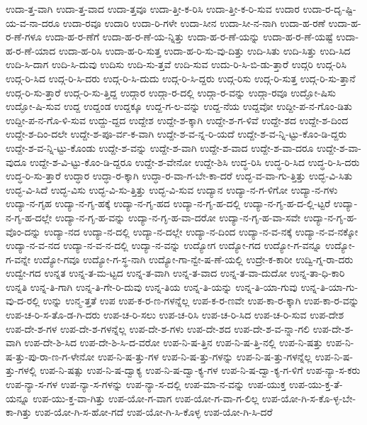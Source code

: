 {ಉದಾ-ತ್ತ-ವಾಗಿ
ಉದಾ-ತ್ತ-ವಾದ
ಉದಾ-ತ್ತವೂ
ಉದಾ-ತ್ತೀ-ಕ-ರಿಸಿ
ಉದಾ-ತ್ತೀ-ಕ-ರಿ-ಸುವ
ಉದಾರ
ಉದಾ-ರ-ದೃ-ಷ್ಟಿ-ಯ-ವ-ನಾ-ದರೂ
ಉದಾ-ರವೂ
ಉದಾರಿ
ಉದಾ-ರಿ-ಗಳೇ
ಉದಾ-ಸೀನ
ಉದಾ-ಸೀ-ನ-ನಾಗಿ
ಉದಾ-ಹ-ರಣೆ
ಉದಾ-ಹ-ರ-ಣೆ-ಗಳೂ
ಉದಾ-ಹ-ರ-ಣೆಗೆ
ಉದಾ-ಹ-ರ-ಣೆ-ಯ-ನ್ನಿತ್ತು
ಉದಾ-ಹ-ರ-ಣೆ-ಯನ್ನು
ಉದಾ-ಹ-ರ-ಣೆ-ಯಷ್ಟೆ
ಉದಾ-ಹ-ರ-ಣೆ-ಯಾದ
ಉದಾ-ಹ-ರಿಸಿ
ಉದಾ-ಹ-ರಿ-ಸುತ್ತ
ಉದಾ-ಹ-ರಿ-ಸು-ವು-ದಿತ್ತು
ಉದಿ-ಸಿತು
ಉದಿ-ಸಿತ್ತು
ಉದಿ-ಸಿದ
ಉದಿ-ಸಿ-ದಾಗ
ಉದಿ-ಸಿ-ದುವು
ಉದಿಸು
ಉದಿ-ಸು-ತ್ತವೆ
ಉದಿ-ಸುವ
ಉದು-ರಿ-ಸಿ-ಬಿ-ಡು-ತ್ತಾರೆ
ಉದ್ಗರಿ
ಉದ್ಗ-ರಿಸಿ
ಉದ್ಗ-ರಿ-ಸಿದ
ಉದ್ಗ-ರಿ-ಸಿ-ದರು
ಉದ್ಗ-ರಿ-ಸಿ-ದುದು
ಉದ್ಗ-ರಿ-ಸಿ-ದ್ದರು
ಉದ್ಗ-ರಿಸು
ಉದ್ಗ-ರಿ-ಸುತ್ತ
ಉದ್ಗ-ರಿ-ಸು-ತ್ತಾನೆ
ಉದ್ಗ-ರಿ-ಸು-ತ್ತಾರೆ
ಉದ್ಗ-ರಿ-ಸು-ತ್ತಿದ್ದ
ಉದ್ಗಾರ
ಉದ್ಗಾ-ರ-ದಲ್ಲಿ
ಉದ್ಗಾ-ರ-ವನ್ನು
ಉದ್ಗಾ-ರವೂ
ಉದ್ಘೋ-ಷಿಸು
ಉದ್ಘೋ-ಷಿ-ಸುವ
ಉದ್ದ
ಉದ್ದಂಡ
ಉದ್ದಕ್ಕೂ
ಉದ್ದ-ಗ-ಲ-ವನ್ನು
ಉದ್ದ-ನೆಯ
ಉದ್ದವೋ
ಉದ್ದೀ-ಪ-ನ-ಗೊಂ-ಡಿತು
ಉದ್ದೀ-ಪ-ನ-ಗೊ-ಳಿ-ಸುವ
ಉದ್ದು-ದ್ದದ
ಉದ್ದೇಶ
ಉದ್ದೇ-ಶ-ಕ್ಕಾಗಿ
ಉದ್ದೇ-ಶ-ಗ-ಳಿವೆ
ಉದ್ದೇ-ಶದ
ಉದ್ದೇ-ಶ-ದಿಂದ
ಉದ್ದೇ-ಶ-ದಿಂ-ದಲೇ
ಉದ್ದೇ-ಶ-ಪೂ-ರ್ವ-ಕ-ವಾಗಿ
ಉದ್ದೇ-ಶ-ವ-ನ್ನ-ರಿ-ಯದೆ
ಉದ್ದೇ-ಶ-ವ-ನ್ನಿ-ಟ್ಟು-ಕೊಂ-ಡಿ-ದ್ದರು
ಉದ್ದೇ-ಶ-ವ-ನ್ನಿ-ಟ್ಟು-ಕೊಂಡು
ಉದ್ದೇ-ಶ-ವನ್ನು
ಉದ್ದೇ-ಶ-ವಾಗಿ
ಉದ್ದೇ-ಶ-ವಾದ
ಉದ್ದೇ-ಶ-ವಾ-ದರೂ
ಉದ್ದೇ-ಶ-ವಾ-ವುದೂ
ಉದ್ದೇ-ಶ-ವಿ-ಟ್ಟು-ಕೊಂ-ಡಿ-ದ್ದರೂ
ಉದ್ದೇ-ಶ-ವೇನೋ
ಉದ್ದೇ-ಶಿಸಿ
ಉದ್ಧ-ರಿಸಿ
ಉದ್ಧ-ರಿ-ಸಿದ
ಉದ್ಧ-ರಿ-ಸಿ-ದರು
ಉದ್ಧ-ರಿ-ಸು-ತ್ತಾರೆ
ಉದ್ಧಾರ
ಉದ್ಧಾ-ರ-ಕ್ಕಾಗಿ
ಉದ್ಧಾ-ರ-ವಾ-ಗ-ಬೇ-ಕಾ-ದರೆ
ಉದ್ಭ-ವ-ವಾ-ಗು-ತ್ತಿತ್ತು
ಉದ್ಭ-ವಿ-ಸಿತು
ಉದ್ಭ-ವಿ-ಸಿದೆ
ಉದ್ಭ-ವಿಸು
ಉದ್ಭ-ವಿ-ಸು-ತ್ತಿತ್ತು
ಉದ್ಭ-ವಿ-ಸುವ
ಉದ್ಯಾನ
ಉದ್ಯಾ-ನ-ಗ-ಳಿಗೋ
ಉದ್ಯಾ-ನ-ಗಳು
ಉದ್ಯಾ-ನ-ಗೃಹ
ಉದ್ಯಾ-ನ-ಗೃ-ಹಕ್ಕೆ
ಉದ್ಯಾ-ನ-ಗೃ-ಹದ
ಉದ್ಯಾ-ನ-ಗೃ-ಹ-ದಲ್ಲಿ
ಉದ್ಯಾ-ನ-ಗೃ-ಹ-ದ-ಲ್ಲಿ-ಟ್ಟರೆ
ಉದ್ಯಾ-ನ-ಗೃ-ಹ-ದಲ್ಲೇ
ಉದ್ಯಾ-ನ-ಗೃ-ಹ-ವನ್ನು
ಉದ್ಯಾ-ನ-ಗೃ-ಹ-ವಾ-ದರೋ
ಉದ್ಯಾ-ನ-ಗೃ-ಹ-ವಾ-ಸವೇ
ಉದ್ಯಾ-ನ-ಗೃ-ಹ-ವೊಂ-ದನ್ನು
ಉದ್ಯಾ-ನದ
ಉದ್ಯಾ-ನ-ದಲ್ಲಿ
ಉದ್ಯಾ-ನ-ದಲ್ಲೇ
ಉದ್ಯಾ-ನ-ದಿಂದ
ಉದ್ಯಾ-ನ-ವ-ನಕ್ಕೆ
ಉದ್ಯಾ-ನ-ವ-ನಕ್ಕೋ
ಉದ್ಯಾ-ನ-ವ-ನದ
ಉದ್ಯಾ-ನ-ವ-ನ-ದಲ್ಲಿ
ಉದ್ಯಾ-ನ-ವನ್ನು
ಉದ್ಯೋಗ
ಉದ್ಯೋ-ಗದ
ಉದ್ಯೋ-ಗ-ವನ್ನೂ
ಉದ್ಯೋ-ಗ-ವನ್ನೇ
ಉದ್ಯೋ-ಗವೂ
ಉದ್ಯೋ-ಗ-ಸ್ಥ-ನಾಗಿ
ಉದ್ಯೋ-ಗಾ-ನ್ವೇ-ಷ-ಣೆ-ಯಲ್ಲಿ
ಉದ್ರೇ-ಕ-ಕಾರೀ
ಉದ್ವಿ-ಗ್ನ-ರಾ-ದರು
ಉದ್ವೇ-ಗದ
ಉನ್ನತ
ಉನ್ನ-ತ-ಮ-ಟ್ಟದ
ಉನ್ನ-ತ-ವಾಗಿ
ಉನ್ನ-ತ-ವಾದ
ಉನ್ನ-ತ-ವಾ-ದುದೋ
ಉನ್ನ-ತಾ-ಧಿ-ಕಾರಿ
ಉನ್ನತಿ
ಉನ್ನ-ತಿ-ಗಾಗಿ
ಉನ್ನ-ತಿ-ಗೇ-ರಿ-ದುವು
ಉನ್ನ-ತಿಯ
ಉನ್ನ-ತಿ-ಯನ್ನು
ಉನ್ನ-ತಿ-ಯಾ-ಗುವು
ಉನ್ನ-ತಿ-ಯಾ-ಗು-ವು-ದ-ರಲ್ಲಿ
ಉನ್ನು
ಉನ್ಮ-ತ್ತತೆ
ಉಪ
ಉಪ-ಕ-ರ-ಣ-ಗಳನ್ನೆಲ್ಲ
ಉಪ-ಕ-ರ-ಣವೇ
ಉಪ-ಕಾ-ರ-ಕ್ಕಾಗಿ
ಉಪ-ಕಾ-ರ-ವನ್ನು
ಉಪ-ಚ-ರಿ-ಸ-ತೊ-ಡ-ಗಿ-ದರು
ಉಪ-ಚ-ರಿ-ಸಲು
ಉಪ-ಚ-ರಿಸಿ
ಉಪ-ಚ-ರಿ-ಸಿದ
ಉಪ-ಚ-ರಿ-ಸುವ
ಉಪ-ದೇಶ
ಉಪ-ದೇ-ಶ-ಗಳ
ಉಪ-ದೇ-ಶ-ಗಳನ್ನೆಲ್ಲ
ಉಪ-ದೇ-ಶ-ಗಳು
ಉಪ-ದೇ-ಶದ
ಉಪ-ದೇ-ಶ-ವ-ನ್ನಾ-ಗಲಿ
ಉಪ-ದೇ-ಶ-ವಾಗಿ
ಉಪ-ದೇ-ಶಿ-ಸಿದ
ಉಪ-ದೇ-ಶಿ-ಸಿ-ದ-ವರೋ
ಉಪ-ನಿ-ಷ-ತ್ತಿನ
ಉಪ-ನಿ-ಷ-ತ್ತಿ-ನಲ್ಲಿ
ಉಪ-ನಿ-ಷತ್ತು
ಉಪ-ನಿ-ಷ-ತ್ತು-ಪು-ರಾ-ಣ-ಗ-ಳೇನೋ
ಉಪ-ನಿ-ಷ-ತ್ತು-ಗಳ
ಉಪ-ನಿ-ಷ-ತ್ತು-ಗಳನ್ನು
ಉಪ-ನಿ-ಷ-ತ್ತು-ಗಳನ್ನೆಲ್ಲ
ಉಪ-ನಿ-ಷ-ತ್ತು-ಗಳಲ್ಲಿ
ಉಪ-ನಿ-ಷತ್ಸು
ಉಪ-ನಿ-ಷ-ದ್ವಾಕ್ಯ
ಉಪ-ನಿ-ಷ-ದ್ವಾ-ಕ್ಯ-ಗಳ
ಉಪ-ನಿ-ಷ-ದ್ವಾ-ಕ್ಯ-ಗ-ಳಿಗೆ
ಉಪ-ನ್ಯಾ-ಸ-ಕರು
ಉಪ-ನ್ಯಾ-ಸ-ಗಳ
ಉಪ-ನ್ಯಾ-ಸ-ಗಳನ್ನು
ಉಪ-ನ್ಯಾ-ಸ-ದಲ್ಲಿ
ಉಪ-ಮಾ-ನ-ವನ್ನು
ಉಪ-ಯುಕ್ತ
ಉಪ-ಯು-ಕ್ತ-ತೆ-ಯನ್ನೂ
ಉಪ-ಯು-ಕ್ತ-ವಾ-ಗಿತ್ತು
ಉಪ-ಯೋ-ಗ-ವಾಗ
ಉಪ-ಯೋ-ಗ-ವಾ-ಗ-ಲಿಲ್ಲ
ಉಪ-ಯೋ-ಗಿ-ಸ-ಕೊ-ಳ್ಳ-ಬೇ-ಕಾ-ಗಿತ್ತು
ಉಪ-ಯೋ-ಗಿ-ಸ-ಹೋ-ಗದೆ
ಉಪ-ಯೋ-ಗಿ-ಸಿ-ಕೊಳ್ಳ
ಉಪ-ಯೋ-ಗಿ-ಸಿ-ದರೆ
}
